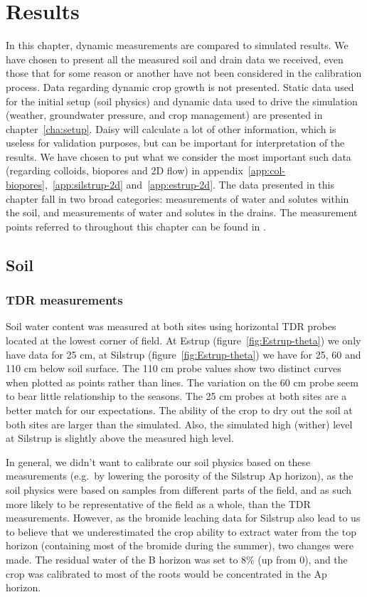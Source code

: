 \chapter{Results}

In this chapter, dynamic measurements are compared to simulated
results.  We have chosen to present all the measured soil and drain
data we received, even those that for some reason or another have not
been considered in the calibration process.  Data regarding dynamic
crop growth is not presented.  Static data used for the initial setup
(soil physics) and dynamic data used to drive the simulation (weather,
groundwater pressure, and crop management) are presented in
chapter~\ref{cha:setup}.  Daisy will calculate a lot of other
information, which is useless for validation purposes, but can be
important for interpretation of the results.  We have chosen to put
what we consider the most important such data (regarding colloids,
biopores and 2D flow) in
appendix~\ref{app:col-biopores},~\ref{app:silstrup-2d}
and~\ref{app:estrup-2d}.  The data presented in this chapter fall in
two broad categories: measurements of water and solutes within the
soil, and measurements of water and solutes in the drains.  The
measurement points referred to throughout this chapter can be found in
\citet{vap2009}.

\section{Soil}

\subsection{TDR measurements}

Soil water content was measured at both sites using horizontal TDR
probes located at the lowest corner of field.  At Estrup
(figure~\ref{fig:Estrup-theta}) we only have data for 25 cm, at
Silstrup (figure~\ref{fig:Estrup-theta}) we have for 25, 60 and 110 cm
below soil surface.  The 110 cm probe values show two distinct curves
when plotted as points rather than lines.  The variation on the 60 cm
probe seem to bear little relationship to the seasons.  The 25 cm
probes at both sites are a better match for our expectations.  The
ability of the crop to dry out the soil at both sites are larger than
the simulated.  Also, the simulated high (wither) level at Silstrup is
slightly above the measured high level.

In general, we didn't want to calibrate our soil physics based on
these measurements (e.g.\ by lowering the porosity of the Silstrup Ap
horizon), as the soil physics were based on samples from different
parts of the field, and as such more likely to be representative of
the field as a whole, than the TDR measurements.  However, as the
bromide leaching data for Silstrup also lead to us to believe that we
underestimated the crop ability to extract water from the top horizon
(containing most of the bromide during the summer), two changes were
made.  The residual water of the B horizon was set to 8\% (up from 0),
and the crop was calibrated to most of the roots would be concentrated
in the Ap horizon.

